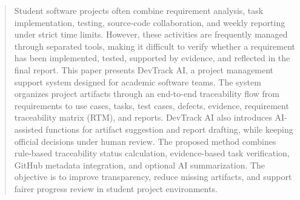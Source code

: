 \begin{abstract}
Student software projects often combine requirement analysis, task implementation,
testing, source-code collaboration, and weekly reporting under strict time limits.
However, these activities are frequently managed through separated tools, making it
difficult to verify whether a requirement has been implemented, tested, supported by
evidence, and reflected in the final report. This paper presents DevTrack AI, a
project management support system designed for academic software teams. The system
organizes project artifacts through an end-to-end traceability flow from requirements
to use cases, tasks, test cases, defects, evidence, requirement traceability matrix
(RTM), and reports. DevTrack AI also introduces AI-assisted functions for artifact
suggestion and report drafting, while keeping official decisions under human review.
The proposed method combines rule-based traceability status calculation,
evidence-based task verification, GitHub metadata integration, and optional AI
summarization. The objective is to improve transparency, reduce missing artifacts,
and support fairer progress review in student project environments.

\end{abstract}
